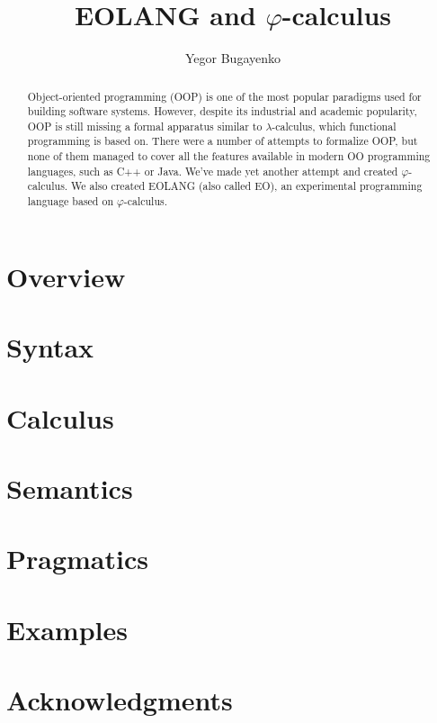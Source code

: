 \documentclass[sigplan,nonacm=true]{acmart}
\title{EOLANG and $\varphi$-calculus}
\author{Yegor Bugayenko}{}{}
\affiliation{
  \institution{}
  \city{Moscow}
  \country{Russia}
}
\theoremstyle{theorems}
\newcommand{\phic}{{$\varphi$-calculus}}
\newcommand{\eo}{{\sffamily EO}}
\begin{document}
\begin{abstract}
Object-oriented programming (OOP) is one of the most popular
paradigms used for building software systems. However, despite
its industrial and academic popularity, OOP is still missing
a formal apparatus similar to $\lambda$-calculus, which functional
programming is based on. There were a number of attempts to formalize
OOP, but none of them managed to cover all the features available in
modern OO programming languages, such as C++ or Java.
We've made yet another attempt and created \phic{}. We also
created EOLANG (also called \eo{}), an experimental
programming language based on \phic{}.
\end{abstract}

\maketitle

\section{Overview}


\section{Syntax}
\label{sec:syntax}


\section{Calculus}
\label{sec:calculus}


\section{Semantics}
\label{sec:semantics}


\section{Pragmatics}
\label{sec:pragmatics}


\section{Examples}
\label{sec:examples}


\section{Acknowledgments}
\end{document}
